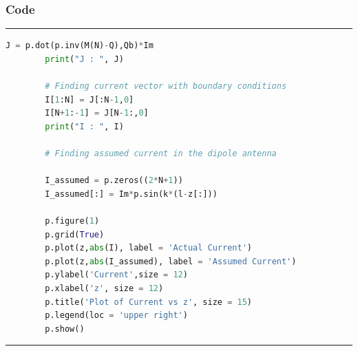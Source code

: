 \documentclass[12pt, a4paper]{article}
\begin{document}
\subsubsection{Code}
\hrule
    \begin{lstlisting}[language=Python]
        J = p.dot(p.inv(M(N)-Q),Qb)*Im
        print("J : ", J)

        # Finding current vector with boundary conditions
        I[1:N] = J[:N-1,0]
        I[N+1:-1] = J[N-1:,0]
        print("I : ", I)

        # Finding assumed current in the dipole antenna

        I_assumed = p.zeros((2*N+1))
        I_assumed[:] = Im*p.sin(k*(l-z[:]))

        p.figure(1)
        p.grid(True)
        p.plot(z,abs(I), label = 'Actual Current')
        p.plot(z,abs(I_assumed), label = 'Assumed Current')
        p.ylabel('Current',size = 12)
        p.xlabel('z', size = 12)
        p.title('Plot of Current vs z', size = 15)
        p.legend(loc = 'upper right')
        p.show()
    \end{lstlisting}
\hrule
\end{document}
